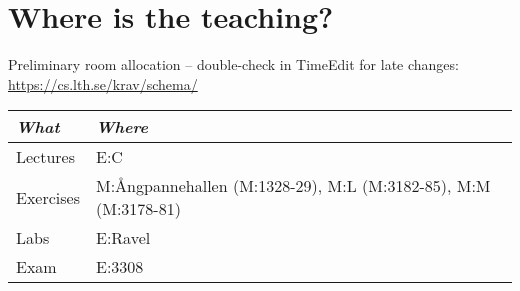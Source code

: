\documentclass{program}
\begin{document}
\section{Where is the teaching?}

\noindent Preliminary room allocation -- double-check in TimeEdit for late changes:\\ \url{https://cs.lth.se/krav/schema/}
\begin{flushleft}
\small
\begin{tabular}{l | l } 
{\it What} & {\it Where} \\
\hline
Lectures & E:C  
\\
Exercises &  	
M:Ångpannehallen (M:1328-29),  	
M:L (M:3182-85),  	
M:M (M:3178-81) %
\\
Labs & E:Ravel %
\\
Exam & E:3308\\
\end{tabular}
\end{flushleft}

\end{document}
